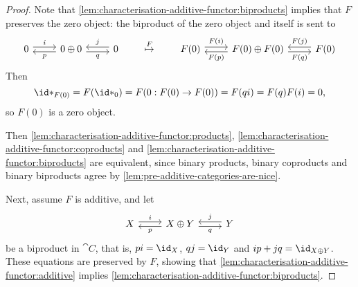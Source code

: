 \begin{proof}
Note that \cref{lem:characterisation-additive-functor:biproducts} implies that \(F\) preserves the zero object: the biproduct of the zero object and itself is sent to
\begin{equation*}
  \begin{tikzcd}
    0 \ar[r, shift left, "i"] & 0\oplus 0 \ar[l, shift left, "p"] \ar[r, shift right, "q"'] & 0 \ar[l, shift right, "j"']
  \end{tikzcd}
  \qquad
  \overset{F}{\mapsto}
  \qquad
  \begin{tikzcd}
    F(0) \ar[r, shift left, "F(i)"] & F(0)\oplus F(0) \ar[l, shift left, "F(p)"] \ar[r, shift right, "F(q)"'] & F(0) \ar[l, shift right, "F(j)"']
  \end{tikzcd}
\end{equation*}
Then
\[ \id*_{F(0)} = F(\id*_0) = F(0\colon F(0)\to F(0)) = F(qi) = F(q)F(i) = 0\text{,} \]
so \(F(0)\) is a zero object.

Then \cref{lem:characterisation-additive-functor:products}, \cref{lem:characterisation-additive-functor:coproducts} and \cref{lem:characterisation-additive-functor:biproducts} are equivalent, since binary products, binary coproducts and binary biproducts agree by \cref{lem:pre-additive-categories-are-nice}.

Next, assume \(F\) is additive, and let
\begin{equation*}
  \begin{tikzcd}
    X \ar[r, shift left, "i"] & X\oplus Y \ar[l, shift left, "p"] \ar[r, shift right, "q"'] & Y \ar[l, shift right, "j"']
  \end{tikzcd}
\end{equation*}
be a biproduct in \(\cat C\), that is, \(pi=\id_X\), \(qj=\id_Y\) and \(ip+jq=\id_{X\oplus Y}\).
These equations are preserved by \(F\), showing that \cref{lem:characterisation-additive-functor:additive} implies \cref{lem:characterisation-additive-functor:biproducts}.


\end{proof}
